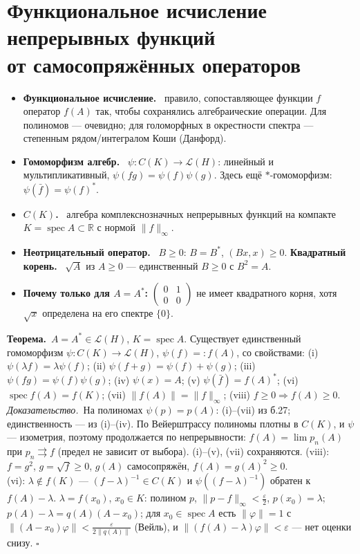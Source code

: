 \documentclass[11pt,a4paper]{article}
\newcommand{\Lc}{\mathcal L}
\newcommand{\RR}{\mathbb R}
\newcommand{\spec}{\operatorname{spec}}
\newcommand{\df}[1]{\textbf{#1.}~}
\newcommand{\thm}{\textbf{Теорема.}~}
\newcommand{\pf}{\textit{Доказательство.}~}
\newcommand{\qedd}{\hfill$\square$}
\begin{document}
\section[Функциональное исчисление непрерывных функций от $A=A^*$]{Функциональное исчисление непрерывных функций\\ от самосопряжённых операторов}
\begin{defs}
\begin{itemize}
\item \df{Функциональное исчисление} правило, сопоставляющее функции $f$ оператор $f(A)$ так, чтобы сохранялись алгебраические операции. Для полиномов — очевидно; для голоморфных в окрестности спектра — степенным рядом/интегралом Коши (Данфорд).
\item \df{Гомоморфизм алгебр} $\psi:C(K)\to\Lc(H)$: линейный и мультипликативный, $\psi(fg)=\psi(f)\psi(g)$. Здесь ещё $*$-гомоморфизм: $\psi(\bar f)=\psi(f)^*$.
\item \df{$C(K)$} алгебра комплекснозначных непрерывных функций на компакте $K=\spec A\subset\RR$ с нормой $\|f\|_\infty$.
\item \df{Неотрицательный оператор} $B\ge0$: $B=B^*$, $(Bx,x)\ge0$. \df{Квадратный корень} $\sqrt A$ из $A\ge0$ — единственный $B\ge0$ с $B^2=A$.
\item \textbf{Почему только для $A=A^*$:} $\begin{pmatrix}0&1\\0&0\end{pmatrix}$ не имеет квадратного корня, хотя $\sqrt x$ определена на его спектре $\{0\}$.
\end{itemize}
\end{defs}

\thm $A=A^*\in\Lc(H)$, $K=\spec A$. Существует единственный гомоморфизм $\psi:C(K)\to\Lc(H)$, $\psi(f)=:f(A)$, со свойствами: (i) $\psi(\lambda f)=\lambda\psi(f)$; (ii) $\psi(f+g)=\psi(f)+\psi(g)$; (iii) $\psi(fg)=\psi(f)\psi(g)$; (iv) $\psi(x)=A$; (v) $\psi(\bar f)=f(A)^*$; (vi) $\spec f(A)=f(K)$; (vii) $\|f(A)\|=\|f\|_\infty$; (viii) $f\ge0\Rightarrow f(A)\ge0$.\\
\pf На полиномах $\psi(p)=p(A)$: (i)–(vii) из б.27; единственность — из (i)–(iv). По Вейерштрассу полиномы плотны в $C(K)$, и $\psi$ — изометрия, поэтому продолжается по непрерывности: $f(A)=\lim p_n(A)$ при $p_n\rightrightarrows f$ (предел не зависит от выбора). (i)–(v), (vii) сохраняются. (viii): $f=g^2$, $g=\sqrt f\ge0$, $g(A)$ самосопряжён, $f(A)=g(A)^2\ge0$.\\
(vi): $\lambda\notin f(K)$ — $(f-\lambda)^{-1}\in C(K)$ и $\psi((f-\lambda)^{-1})$ обратен к $f(A)-\lambda$. $\lambda=f(x_0)$, $x_0\in K$: полином $p$, $\|p-f\|_\infty<\frac\varepsilon2$, $p(x_0)=\lambda$; $p(A)-\lambda=q(A)(A-x_0)$; для $x_0\in\spec A$ есть $\|\varphi\|=1$ с $\|(A-x_0)\varphi\|<\frac\varepsilon{2\|q(A)\|}$ (Вейль), и $\|(f(A)-\lambda)\varphi\|<\varepsilon$ — нет оценки снизу. \qedd
\end{document}
